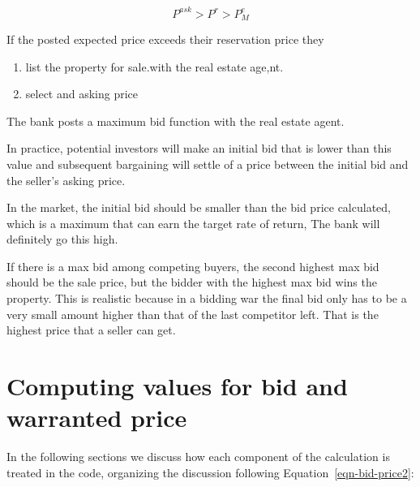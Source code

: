 \[P^{ask}> P^r> P_M^e\] 

If the posted expected price exceeds their \gls{reservation price} they 
\begin{enumerate}
    \item list  the property for sale.with the real estate age,nt.
    \item select and asking price   
\end{enumerate}

The bank posts a \gls{maximum bid function} with the real estate agent.

In practice, potential investors will make an  initial  bid that is lower than this value and subsequent bargaining will settle of a price between the initial bid and the seller's asking price.

In the market, the initial bid should be smaller than the bid price calculated, which is a maximum that can earn the target rate of return, The bank will definitely go this high. 

If there is a  max bid among competing buyers, the second highest max bid should be the sale price, but the bidder with the highest max bid wins the property. This is realistic because in a bidding war the final bid only has to be a very small amount higher than that of the last competitor left.
That is the highest price that a seller can get.









\section{Computing values for bid and warranted price}

In the following sections we discuss %
how each component of the calculation is treated in the code, organizing the discussion following Equation~\ref{eqn-bid-price2}:


